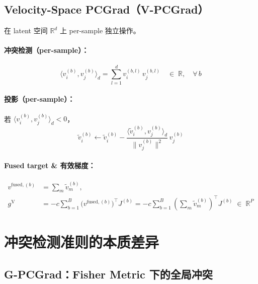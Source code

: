 \documentclass[11pt,a4paper]{article}
\newcommand{\R}{\mathbb{R}}
\theoremstyle{definition}
\begin{document}
\subsection{Velocity-Space PCGrad（V-PCGrad）}

在 latent 空间 $\R^d$ 上 per-sample 独立操作。

\paragraph{冲突检测（per-sample）：}
\begin{equation}
\langle v_i^{(b)}, v_j^{(b)}\rangle_d = \sum_{l=1}^d v_i^{(b,l)}\, v_j^{(b,l)} \quad\in\;\R, \quad \forall\, b
\label{eq:vpcgrad_dot}
\end{equation}

\paragraph{投影（per-sample）：} 若 $\langle v_i^{(b)}, v_j^{(b)}\rangle_d < 0$，
\begin{equation}
\tilde{v}_i^{(b)} \leftarrow \tilde{v}_i^{(b)} - \frac{\langle \tilde{v}_i^{(b)}, v_j^{(b)}\rangle_d}{\|v_j^{(b)}\|^2}\,v_j^{(b)}
\label{eq:vpcgrad_proj}
\end{equation}

\paragraph{Fused target \& 有效梯度：}
\begin{align}
v^{\mathrm{fused},(b)} &= \sum_m \tilde{v}_m^{(b)}, \label{eq:vpcgrad_fused}\\[4pt]
g^{\mathrm{V}} &= -c\sum_{b=1}^B \bigl(v^{\mathrm{fused},(b)}\bigr)^\top J^{(b)}
= -c\sum_{b=1}^B \left(\sum_m \tilde{v}_m^{(b)}\right)^\top J^{(b)} \;\in\;\R^P
\label{eq:vpcgrad_output}
\end{align}

\section{冲突检测准则的本质差异}
\label{sec:conflict_detection}

\subsection{G-PCGrad：Fisher Metric 下的全局冲突}
\end{document}
